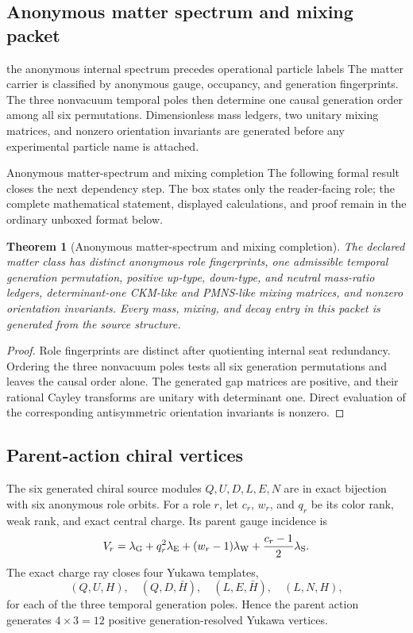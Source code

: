 \documentclass[11pt]{article}
\numberwithin{equation}{section}
\newtheorem{theorem}[definition]{Theorem}
\theoremstyle{remark}
\begin{document}
\subsection{Anonymous matter spectrum and mixing packet}
\begin{interpretivebridge}{the anonymous internal spectrum precedes operational particle labels}
The matter carrier is classified by anonymous gauge, occupancy, and generation fingerprints. The three nonvacuum temporal poles then determine one causal generation order among all six permutations. Dimensionless mass ledgers, two unitary mixing matrices, and nonzero orientation invariants are generated before any experimental particle name is attached.
\end{interpretivebridge}
\begin{proofguide}{Anonymous matter-spectrum and mixing completion}
The following formal result closes the next dependency step. The box states only the reader-facing role; the complete mathematical statement, displayed calculations, and proof remain in the ordinary unboxed format below.
\end{proofguide}
\begin{theorem}[Anonymous matter-spectrum and mixing completion]
The declared matter class has distinct anonymous role fingerprints, one admissible temporal generation permutation, positive up-type, down-type, and neutral mass-ratio ledgers, determinant-one CKM-like and PMNS-like mixing matrices, and nonzero orientation invariants. Every mass, mixing, and decay entry in this packet is generated from the source structure.
\end{theorem}
\begin{proof}
Role fingerprints are distinct after quotienting internal seat redundancy. Ordering the three nonvacuum poles tests all six generation permutations and leaves the causal order alone. The generated gap matrices are positive, and their rational Cayley transforms are unitary with determinant one. Direct evaluation of the corresponding antisymmetric orientation invariants is nonzero.
\end{proof}


\subsection{Parent-action chiral vertices}
The six generated chiral source modules $Q,U,D,L,E,N$ are in exact bijection with six anonymous role orbits. For a role $r$, let $c_r$, $w_r$, and $q_r$ be its color rank, weak rank, and exact central charge. Its parent gauge incidence is
\begin{equation}
V_r
=\lambda_{\rm G}
+q_r^2\lambda_{\rm E}
+(w_r-1)\lambda_{\rm W}
+\frac{c_r-1}{2}\lambda_{\rm S}.
\label{eq:rolegaugevertex}
\end{equation}
The exact charge ray closes four Yukawa templates,
\begin{equation}
(Q,U,H),\quad(Q,D,\bar H),\quad(L,E,\bar H),\quad(L,N,H),
\end{equation}
for each of the three temporal generation poles. Hence the parent action generates $4\times3=12$ positive generation-resolved Yukawa vertices.
\end{document}
